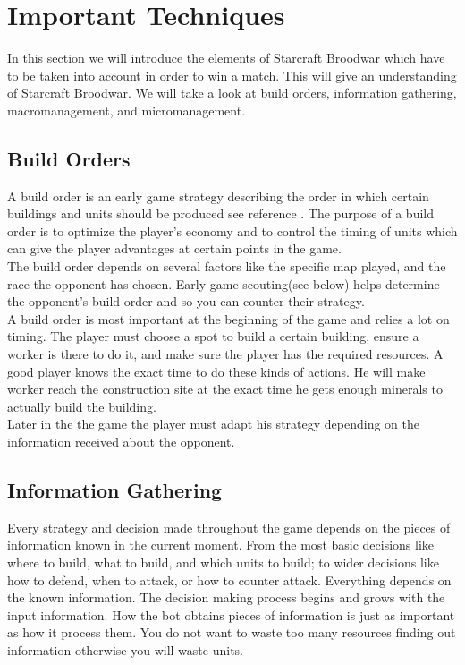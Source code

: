 \section{Important Techniques}
In this section we will introduce the elements of Starcraft Broodwar which have to be taken into account in order to win a match. This will give an understanding 
of Starcraft Broodwar. We will take a look at build orders, information gathering, macromanagement, and
micromanagement.

	\subsection{Build Orders}
		A build order is an early game strategy describing the order in which certain buildings and units should be produced see reference \cite{wiki_build_order}. 
		The purpose of a build order is to optimize the player's economy and to control the timing of units which can give 
		the player advantages at certain points in the game.\\
		The build order depends on several factors like the specific map played, and the race the opponent has chosen. 
		Early game scouting(see below) helps determine the opponent's build order and so you can counter their strategy.\\
		
		A build order is most important at the beginning of the game and relies a lot on timing. 
		The player must choose a spot to build a certain building, ensure a worker is there to do it, 
		and make sure the player has the required resources. 
		A good player knows the exact time to do these kinds of actions. 
		He will make worker reach the construction site at the exact time he gets enough minerals to actually build the building.\\
		
		Later in the the game the player must adapt his strategy depending on the information received about the opponent.
	
	\subsection{Information Gathering}
		Every strategy and decision made throughout the game depends on the pieces of information 
		known in the current moment. From the most basic decisions like where to build, what to build, and
		which units to build; to wider decisions like how to defend, when to attack, or how to counter attack.
		Everything depends on the known information. The decision making process begins and grows with the input information.
		How the bot obtains pieces of information is just as important 
		as how it process them. You do not want to waste too many resources finding out information otherwise you will waste units. 
	
